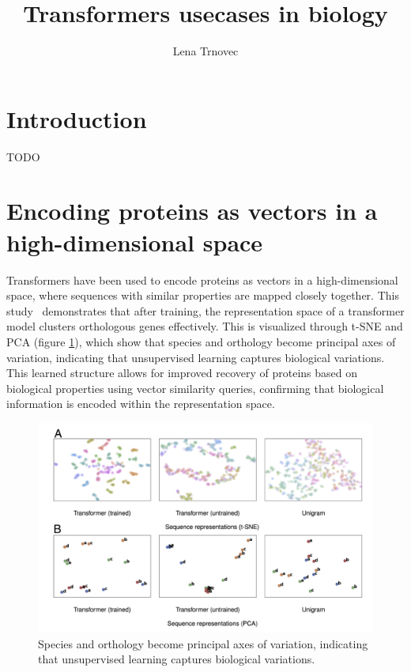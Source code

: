\documentclass[final,5p,times,twocolumn]{elsarticle}
\begin{document}
\begin{frontmatter}

\title{Transformers usecases in biology}
\author[first]{Lena Trnovec}
\end{frontmatter}


\section{Introduction}
\label{introduction}

TODO
\section{Encoding proteins as vectors in a high-dimensional space}
Transformers have been used to encode proteins as vectors in a high-dimensional space, where sequences with similar properties are mapped closely together. This study~\cite{rives_biological_2021} demonstrates that after training, the representation space of a transformer model clusters orthologous genes effectively. This is visualized through t-SNE and PCA (figure \ref{fig:gene-tsne}), which show that species and orthology become principal axes of variation, indicating that unsupervised learning captures biological variations. This learned structure allows for improved recovery of proteins based on biological properties using vector similarity queries, confirming that biological information is encoded within the representation space.
\begin{figure}[ht]
    \centering
    \includegraphics[width=\linewidth]{img/gene-tsne.png}
    \caption{Species and orthology become principal axes of variation, indicating that unsupervised learning captures biological variations.}
    \label{fig:gene-tsne}
\end{figure}
    
\end{document}
